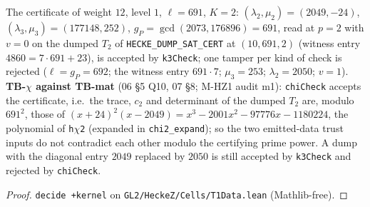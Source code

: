 \begin{theorem}[The K3 certificate of T1 $=(1,10)$, checked]\label{chk:hz-T1-cert}
  \leanok
  The certificate of weight $12$, level $1$, $\ell=691$, $K=2$: $(\lambda_2,\mu_2)=(2049,-24)$, $(\lambda_3,\mu_3)=(177148,252)$,
  $g_P=\gcd(2073,176896)=691$, read at $p=2$ with $v=0$ on the dumped $T_2$ of \texttt{HECKE\_DUMP\_SAT\_CERT} at $(10,691,2)$
  (witness entry $4860=7\cdot691+23$), is accepted by \texttt{k3Check}; one tamper per kind of check is rejected ($\ell=g_P=692$; the
  witness entry $691\cdot7$; $\mu_3=253$; $\lambda_2=2050$; $v=1$). \textbf{TB-$\chi$ against TB-mat} (06 \S5 Q10, 07 \S8; M-HZ1
  audit m1): \texttt{chiCheck} accepts the certificate, i.e.\ the trace, $c_2$ and determinant of the dumped $T_2$ are, modulo $691^2$,
  those of $(x+24)^2(x-2049)=x^3-2001x^2-97776x-1180224$, the polynomial of \texttt{h$\chi$2} (expanded in \texttt{chi2\_expand});
  so the two emitted-data trust inputs do not contradict each other modulo the certifying prime power. A dump with the diagonal
  entry $2049$ replaced by $2050$ is still accepted by \texttt{k3Check} and rejected by \texttt{chiCheck}.
\end{theorem}
\begin{proof}
  \leanok
  \texttt{decide +kernel} on \texttt{GL2/HeckeZ/Cells/T1Data.lean} (Mathlib-free).
\end{proof}


